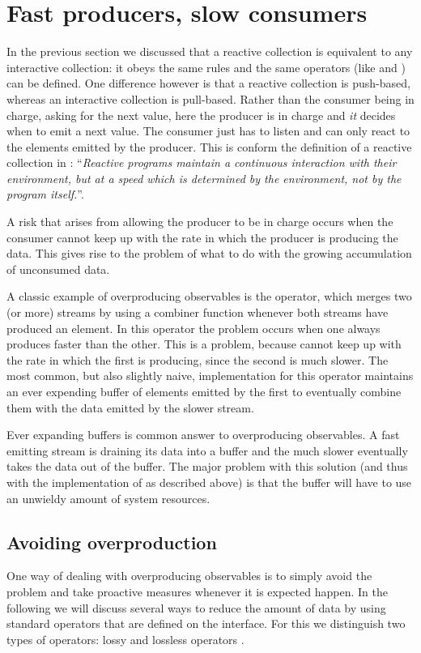 \section{Fast producers, slow consumers}
\label{sec:fastproc-slowcons}
In the previous section we discussed that a reactive collection is equivalent to any interactive collection: it obeys the same rules and the same operators (like  and ) can be defined. One difference however is that a reactive collection is push-based, whereas an interactive collection is pull-based. Rather than the consumer being in charge, asking for the next value, here the producer is in charge and \emph{it} decides when to emit a next value. The consumer just has to listen and can only react to the elements emitted by the producer. This is conform the definition of a reactive collection in : ``\textit{Reactive programs maintain a continuous interaction with their environment, but at a speed which is determined by the environment, not by the program itself.}''.

A risk that arises from allowing the producer to be in charge occurs when the consumer cannot keep up with the rate in which the producer is producing the data. This gives rise to the problem of what to do with the growing accumulation of unconsumed data.

A classic example of overproducing observables is the  operator, which merges two (or more) streams by using a combiner function whenever both streams have produced an element. In this operator the problem occurs when one \obs always produces faster than the other. This is a problem, because  cannot keep up with the rate in which the first \obs is producing, since the second \obs is much slower. The most common, but also slightly naive, implementation for this operator maintains an ever expending buffer of elements emitted by the first \obs to eventually combine them with the data emitted by the slower stream.

Ever expanding buffers is common answer to overproducing observables. A fast emitting stream is draining its data into a buffer and the much slower \obv eventually takes the data out of the buffer. The major problem with this solution (and thus with the implementation of  as described above) is that the buffer will have to use an unwieldy amount of system resources.

\subsection{Avoiding overproduction}
\label{subsec:avoiding-overproduction}
One way of dealing with overproducing observables is to simply avoid the problem and take proactive measures whenever it is expected happen. In the following we will discuss several ways to reduce the amount of data by using standard operators that are defined on the \obs interface. For this we distinguish two types of operators: lossy and lossless operators \cite{Backpressure-Explained}.


